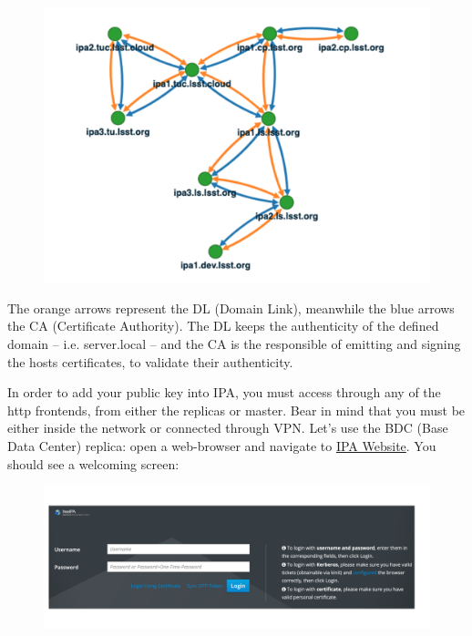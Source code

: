 \begin{figure}
  \includegraphics[width=13cm]{Images/example11.png}
\end{figure}

The orange arrows represent the DL (Domain Link), meanwhile the blue arrows the CA (Certificate
Authority). The DL keeps the authenticity of the defined domain – i.e. server.local – and the CA is the
responsible of emitting and signing the hosts certificates, to validate their authenticity.

\vspace{5 mm}
\newpage

In order to add your public key into IPA, you must access through any of the http frontends, from either
the replicas or master. Bear in mind that you must be either inside the network or connected through VPN.
Let’s use the BDC (Base Data Center) replica: open a web-browser and navigate to \href{https://ipa1.ls.lsst.org}{IPA Website}.
You should see a welcoming screen:

\begin{figure}
  \includegraphics[width=15cm]{Images/example12.png}
\end{figure}


